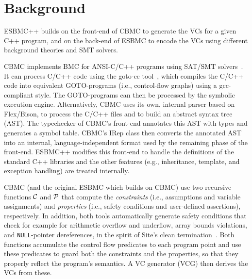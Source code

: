 \documentclass[a4paper]{llncs}
\begin{document}
\section{Background}

ESBMC++ builds on the front-end of CBMC to generate the VCs for a given C++ program,
and on the back-end of ESBMC to encode the VCs using different background theories
and SMT solvers.

\smallskip{}
\label{sec:C-Bounded-Model-Checker}
%
CBMC implements BMC for ANSI-C/C++ programs using SAT/SMT
solvers~\cite{Clarke04}.  It can process C/C++ code using the goto-cc
tool~\cite{Wintersteiger09}, which compiles the C/C++ code into
equivalent GOTO-programs (i.e., control-flow graphs) using a
gcc-compliant style. The GOTO-programs can then be processed by the
symbolic execution engine. Alternatively, CBMC uses its own, internal
parser based on Flex/Bison, to process the C/C++ files and to build an
abstract syntax tree (AST). The typechecker of CBMC's front-end
annotates this AST with types and generates a symbol table. CBMC's IRep
class then converts the annotated AST into an internal,
language-independent format used by the remaining phase of the
front-end.  ESBMC++ modifies this front-end to handle the definitions of
the standard C++ libraries and the other features (e.g., inheritance,
template, and exception handling) are treated internally.

CBMC (and the original ESBMC which builds on CBMC) use two recursive functions
$\cal C$ and $\cal P$ that compute the \emph{constraints}
(i.e., assumptions and variable assignments) and
\emph{properties} (i.e., safety conditions and user-defined
assertions), respectively. In addition, both tools automatically generate safety conditions
that check for example for arithmetic overflow and underflow, array bounds
violations, and \verb|NULL|-pointer dereferences, in the spirit of Site's clean
termination~\cite{Sites74}. Both functions accumulate the control flow
predicates to each program point and use these predicates to guard both
the constraints and the properties, so that they properly reflect the
program's semantics. A VC generator (VCG) then derives the VCs from
these.
\end{document}
